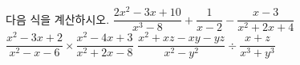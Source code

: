 다음 식을 계산하시오.
 $\dfrac{2x^2-3x+10}{x^3-8}+\dfrac{1}{x-2}-\dfrac{x-3}{x^2+2x+4}$
 $\dfrac{x^2-3x+2}{x^2-x-6}\times\dfrac{x^2-4x+3}{x^2+2x-8}$
 $\dfrac{x^2+xz-xy-yz}{x^2-y^2}\div\dfrac{x+z}{x^3+y^3}$
